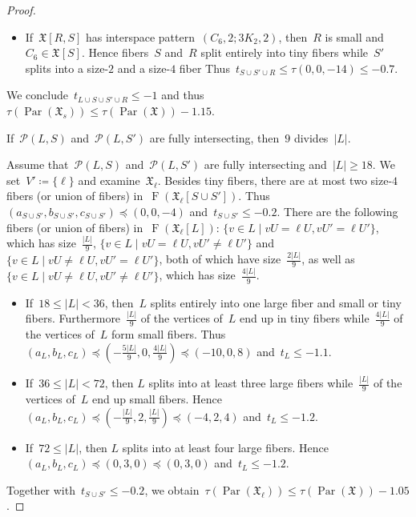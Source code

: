 \documentclass[english,a4paper]{article}
\theoremstyle{plain}
\theoremstyle{definition}
\newcommand{\abs}[1]{| #1 |}
\DeclareMathOperator{\Fibers}{F}
\newcommand{\coherentConfig}{\ensuremath{\mathfrak{X}}}
\newcommand{\fibers}[1]{\ensuremath{\Fibers \left( #1 \right)}}
\newcommand{\interspace}[2]{\ensuremath{\coherentConfig[#1,#2]}}
\newcommand{\inducedCC}[1]{\ensuremath{\coherentConfig[#1]}}
\newcommand{\equivalenceClasses}[1]{\ensuremath{\mathcal{P}(#1)}}
\DeclareMathOperator{\parameters}{Par}
\newcommand{\ipsixMatchingAndCycle}     {\ensuremath{(\cycle{6},2;\disjointCliques{3}{2},2)}}
\newcommand{\clique}[1]{\ensuremath{K_{#1}}}
\newcommand{\cycle}[1]{\ensuremath{C_{#1}}}
\newcommand{\disjointCliques}[2]{\ensuremath{#1 \clique{#2}}}
\begin{document}
\begin{proof}
\begin{itemize}
        \item
        If~$\interspace{R}{S}$ has interspace pattern~$\ipsixMatchingAndCycle$, then~$R$ is small and~$\cycle{6} \in \inducedCC{S}$.
        Hence fibers~$S$ and~$R$ split entirely into tiny fibers while~$S'$ splits into a size-$2$ and a size-$4$ fiber
        Thus~$t_{S \cup S' \cup R} \leq \tau(0,0,-14) \leq -0.7$.
    \end{itemize}
    We conclude~$t_{L \cup S \cup S' \cup R} \leq -1$ and thus~$\tau(\parameters(\coherentConfig_s)) \leq \tau(\parameters(\coherentConfig))- 1.15$.

    If~$\equivalenceClasses{L,S}$ and~$\equivalenceClasses{L, S'}$ are fully intersecting, then~$9$ divides~$|L|$.

    Assume that~$\equivalenceClasses{L,S}$ and~$\equivalenceClasses{L, S'}$ are fully intersecting and~$|L| \geq 18$.
    We set~$V' \coloneqq \{\ell\}$ and examine~$\coherentConfig_\ell$.
    Besides tiny fibers, there are at most two size-$4$ fibers (or union of fibers) in~$\fibers{\coherentConfig_\ell[S \cup S']}$.
    Thus~$(a_{S \cup S'},b_{S \cup S'}, c_{S \cup S'}) \preceq (0,0,-4)$ and~$t_{S \cup S'} \leq - 0.2$.
    There are the following fibers (or union of fibers) in~$\fibers{\coherentConfig_\ell[L]}$:
    $ \{ v \in L \mid v U =    \ell U, v U' =    \ell U'\}$, which has size~$\frac{\abs{L}}{9}$,
    $ \{ v \in L \mid v U =    \ell U, v U' \neq \ell U'\}$ and
    $ \{ v \in L \mid v U \neq \ell U, v U' =    \ell U'\}$, both of which have size~$\frac{2\abs{L}}{9}$, as well as
    $ \{ v \in L \mid v U \neq \ell U, v U' \neq \ell U'\}$, which has size~$\frac{4\abs{L}}{9}$.
    \begin{itemize}
        \item
        If~$18 \leq \abs{L} < 36$, then~$L$ splits entirely into one large fiber and small or tiny fibers.
        Furthermore~$\frac{\abs{L}}{9}$ of the vertices of~$L$ end up in tiny fibers while~$\frac{4\abs{L}}{9}$ of the vertices of~$L$ form small fibers.
        Thus~$(a_L,b_L, c_L) \preceq (-\frac{5\abs{L}}{9},0,\frac{4\abs{L}}{9}) \preceq (-10,0,8)$ and~$t_L \leq - 1.1$.
        \item
        If~$36 \leq \abs{L} < 72$, then $L$ splits into at least three large fibers while~$\frac{\abs{L}}{9}$ of the vertices of~$L$ end up small fibers.
        Hence~$(a_L,b_L,c_L) \preceq (-\frac{\abs{L}}{9},2,\frac{\abs{L}}{9}) \preceq (-4,2,4)$ and~$t_L \leq - 1.2$.
        \item
        If~$72 \leq \abs{L}$, then $L$ splits into at least four large fibers.
        Hence~$(a_L,b_L,c_L) \preceq (0,3,0) \preceq (0,3,0)$ and~$t_L \leq - 1.2$.
    \end{itemize}
    Together with~$t_{S \cup S'} \leq - 0.2$, we obtain~$\tau(\parameters(\coherentConfig_\ell)) \leq \tau(\parameters(\coherentConfig))- 1.05$.


\end{proof}
\end{document}
